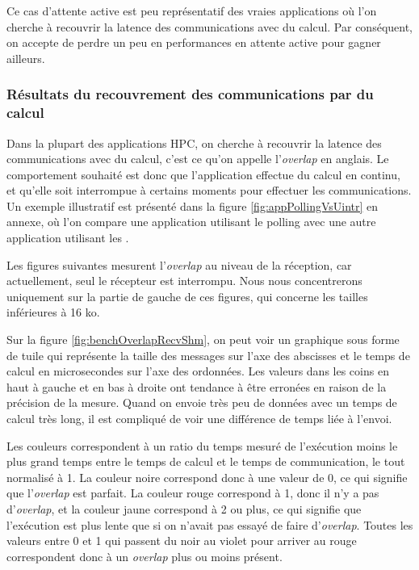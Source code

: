 Ce cas d'attente active est peu représentatif des vraies applications où l'on cherche à recouvrir la latence des communications avec du calcul.
Par conséquent, on accepte de perdre un peu en performances en attente active pour gagner ailleurs.

\subsubsection{Résultats du recouvrement des communications par du calcul}

Dans la plupart des applications HPC, on cherche à recouvrir la latence des communications avec du calcul, c'est ce qu'on appelle l'\emph{overlap} en anglais.
Le comportement souhaité est donc que l'application effectue du calcul en continu, et qu'elle soit interrompue à certains moments pour effectuer les communications.
Un exemple illustratif est présenté dans la figure \ref{fig:appPollingVsUintr} en annexe, où l'on compare une application utilisant le polling avec une autre application utilisant les \uintr{}.

Les figures suivantes mesurent l'\emph{overlap} au niveau de la réception, car actuellement, seul le récepteur est interrompu.
Nous nous concentrerons uniquement sur la partie de gauche de ces figures, qui concerne les tailles inférieures à 16 ko.

Sur la figure \ref{fig:benchOverlapRecvShm}, on peut voir un graphique sous forme de tuile qui représente la taille des messages sur l'axe des abscisses
et le temps de calcul en microsecondes sur l'axe des ordonnées.
Les valeurs dans les coins en haut à gauche et en bas à droite ont tendance à être erronées en raison de la précision de la mesure.
Quand on envoie très peu de données avec un temps de calcul très long, il est compliqué de voir une différence de temps liée à l'envoi.

Les couleurs correspondent à un ratio du temps mesuré de l'exécution moins le plus grand temps entre le temps de calcul et le temps de communication, le tout normalisé à 1.
La couleur noire correspond donc à une valeur de 0, ce qui signifie que l'\emph{overlap} est parfait.
La couleur rouge correspond à 1, donc il n'y a pas d'\emph{overlap},
et la couleur jaune correspond à 2 ou plus, ce qui signifie que l'exécution est plus lente que si on n'avait pas essayé de faire d'\emph{overlap}.
Toutes les valeurs entre 0 et 1 qui passent du noir au violet pour arriver au rouge correspondent donc à un \emph{overlap} plus ou moins présent.

